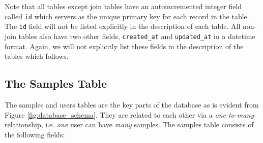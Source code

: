 \documentclass[12pt,twoside]{article}
\begin{document}
Note that all tables except join tables have an autoincremented integer field
called \verb=id= which servers as the unique primary key for each record
in the table. The \verb=id= field will not be listed explicitly in the
description of each table. All non-join tables also have two other
fields, \verb=created_at= and \verb=updated_at= in a datetime format.
Again, we will not explicitly list these fields in the description
of the tables which follows.

\subsection{The Samples Table}
The samples and users tables are the key parts of the database as is
evident from Figure \ref{fig:database_schema}. They are related to each
other via a \emph{one-to-many} relationship, i.e. \emph{one} user
can have \emph{many} samples. The samples table
consists of the following fields:
\end{document}

